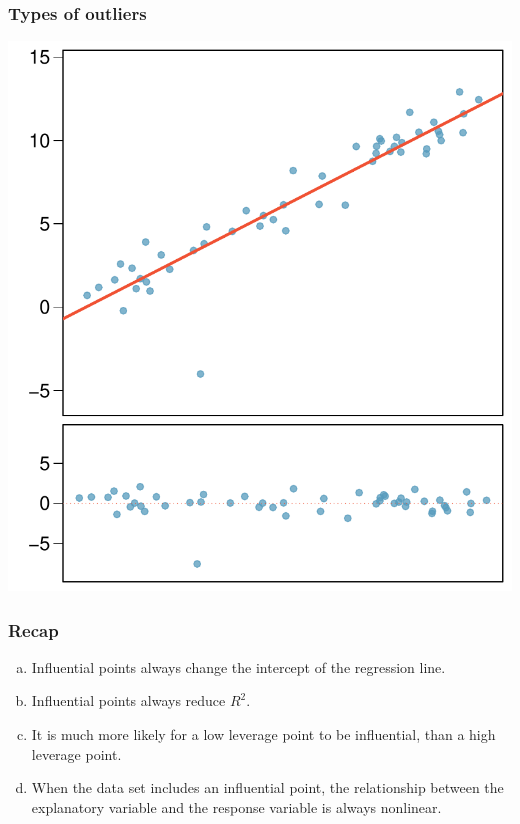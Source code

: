 \begin{frame}
\frametitle{Types of outliers}

{

}
{
\begin{center}
\includegraphics[width=\textwidth]{8-3_outliers/figures/outlierPlots/out1}
\end{center}
}

\end{frame}


\begin{frame}
\frametitle{Recap}


\begin{enumerate}[(a)]
\item Influential points always change the intercept of the regression line.
\item Influential points always reduce $R^2$.
\item It is much more likely for a low leverage point to be influential, than a high leverage point.
\item When the data set includes an influential point, the relationship between the explanatory variable and the response variable is always nonlinear.
\end{enumerate}

\end{frame}

